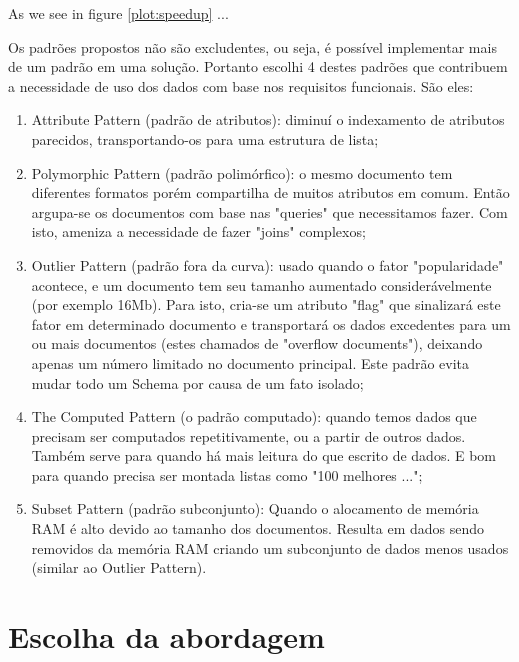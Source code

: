 \documentclass[
	12pt,				%
	openright,			%
	oneside,			%
	a4paper,			%
	english,			%
	french,				%
	spanish,			%
	brazil,				%
	]{abntex2}
\begin{document}
As we see in figure \ref{plot:speedup} ...

Os padrões propostos não são excludentes, ou seja, é possível implementar mais de um padrão em uma solução. Portanto escolhi 4 destes padrões que contribuem a necessidade de uso dos dados com base nos requisitos funcionais. São eles:


\begin{enumerate}
  \item Attribute Pattern (padrão de atributos): diminuí o indexamento de atributos parecidos, transportando-os para uma estrutura de lista;
  \item Polymorphic Pattern (padrão polimórfico): o mesmo documento tem diferentes formatos porém compartilha de muitos atributos em comum. Então argupa-se os documentos com base nas "queries" que necessitamos fazer. Com isto, ameniza a necessidade de fazer "joins" complexos;
  \item Outlier Pattern (padrão fora da curva): usado quando o fator "popularidade" acontece, e um documento tem seu tamanho aumentado considerávelmente (por exemplo 16Mb). Para isto, cria-se um atributo "flag" que sinalizará este fator em determinado documento e transportará os dados excedentes para um ou mais documentos (estes chamados de "overflow documents"), deixando apenas um número limitado no documento principal. Este padrão evita mudar todo um Schema por causa de um fato isolado;
  \item The Computed Pattern (o padrão computado): quando temos dados que precisam ser computados repetitivamente, ou a partir de outros dados. Também serve para quando há mais leitura do que escrito de dados. E bom para quando precisa ser montada listas como "100 melhores ...";
  \item Subset Pattern (padrão subconjunto): Quando o alocamento de memória RAM é alto devido ao tamanho dos documentos. Resulta em dados sendo removidos da memória RAM criando um subconjunto de dados menos usados (similar ao Outlier Pattern).
\end{enumerate}




\chapter{Escolha da abordagem}


 
\end{document}
